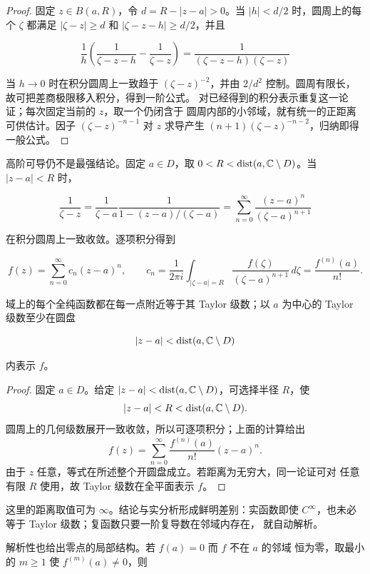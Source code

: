 \begin{proof}
固定 \(z\in B(a,R)\)，令
\(d=R-|z-a|>0\)。当 \(|h|<d/2\) 时，圆周上的每个 \(\zeta\) 都满足
\(|\zeta-z|\ge d\) 和 \(|\zeta-z-h|\ge d/2\)，并且

\[
 \frac1h\left(\frac1{\zeta-z-h}-\frac1{\zeta-z}\right)
 =\frac1{(\zeta-z-h)(\zeta-z)}
\]

当 \(h\to0\) 时在积分圆周上一致趋于 \((\zeta-z)^{-2}\)，并由
\(2/d^2\) 控制。圆周有限长，故可把差商极限移入积分，得到一阶公式。
对已经得到的积分表示重复这一论证；每次固定当前的 \(z\)，取一个仍闭含于
圆周内部的小邻域，就有统一的正距离可供估计。因子
\((\zeta-z)^{-n-1}\) 对 \(z\) 求导产生
\((n+1)(\zeta-z)^{-n-2}\)，归纳即得一般公式。
\end{proof}

高阶可导仍不是最强结论。固定 \(a\in D\)，取
\(0<R<\operatorname{dist}(a,\mathbb{C}\setminus D)\)。当 \(|z-a|<R\) 时，

\[
 \frac1{\zeta-z}
 =\frac1{\zeta-a}\frac1{1-(z-a)/(\zeta-a)}
 =\sum_{n=0}^{\infty}\frac{(z-a)^n}{(\zeta-a)^{n+1}}
\]

在积分圆周上一致收敛。逐项积分得到

\[
 f(z)=\sum_{n=0}^{\infty}c_n(z-a)^n,\qquad
 c_n=\frac1{2\pi i}\int_{|\zeta-a|=R}
 \frac{f(\zeta)}{(\zeta-a)^{n+1}}\,d\zeta
 =\frac{f^{(n)}(a)}{n!}.
\]

\begin{theorem}[全纯函数的解析性]
\label{thm:holomorphic-is-analytic}
域上的每个全纯函数都在每一点附近等于其 Taylor 级数；以 \(a\) 为中心的
Taylor 级数至少在圆盘

\[
 |z-a|<\operatorname{dist}(a,\mathbb{C}\setminus D)
\]

内表示 \(f\)。
\end{theorem}

\begin{proof}
固定 \(a\in D\)。给定
\(|z-a|<\operatorname{dist}(a,\mathbb{C}\setminus D)\)，可选择半径 \(R\)，使
\[
 |z-a|<R<\operatorname{dist}(a,\mathbb{C}\setminus D).
\]
圆周上的几何级数展开一致收敛，所以可逐项积分；上面的计算给出
\[
 f(z)=\sum_{n=0}^{\infty}\frac{f^{(n)}(a)}{n!}(z-a)^n.
\]
由于 \(z\) 任意，等式在所述整个开圆盘成立。若距离为无穷大，同一论证可对
任意有限 \(R\) 使用，故 Taylor 级数在全平面表示 \(f\)。
\end{proof}

这里的距离取值可为 \(\infty\)。结论与实分析形成鲜明差别：实函数即使
\(C^\infty\)，也未必等于 Taylor 级数；复函数只要一阶复导数在邻域内存在，
就自动解析。

解析性也给出零点的局部结构。若 \(f(a)=0\) 而 \(f\) 不在 \(a\) 的邻域
恒为零，取最小的 \(m\ge1\) 使 \(f^{(m)}(a)\ne0\)，则

